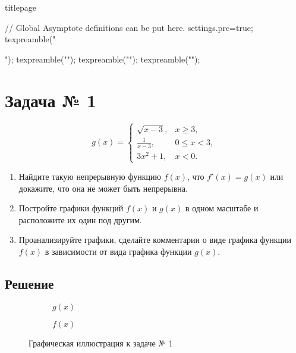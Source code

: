 \documentclass[a4paper,12pt]{article}
\begin{document}
{titlepage}
\clearpage
  \setcounter{page}{2}
  \tableofcontents
\clearpage


\begin{asydef}
// Global Asymptote definitions can be put here.
settings.prc=true;
texpreamble("\usepackage{xltxtra,unicode-math}");
texpreamble("\setmainfont{Times New Roman}");
texpreamble("\setsansfont{Arial}\setmonofont{Courier New}");
texpreamble("");
\end{asydef}

\section{Задача № 1}

\[
  g(x) =
  \begin{cases}
    \sqrt{x - 3}, & x \ge 3, \\
    \frac{1}{x - 3}, & 0 \le x < 3, \\
    3 x^2 + 1, & x < 0.
  \end{cases}
\]

\begin{enumerate}
  \item
    Найдите такую непрерывную функцию \(f(x)\),
    что \(f'(x) = g(x)\) или докажите, что она не может быть непрерывна.
  \item
    Постройте графики функций \(f(x)\) и \(g(x)\) в одном масштабе
    и расположите их один под другим.
  \item
    Проанализируйте графики,
    сделайте комментарии о виде графика функции \(f(x)\)
    в зависимости от вида графика функции \(g(x)\).
\end{enumerate}

\subsection{Решение}

\begin{figure}[htbp]
  \centering
  \begin{subfigure}{\textwidth}
    \centering
    \caption{\(g(x)\)}\label{fig:1-g}
  \end{subfigure}
  \begin{subfigure}{\textwidth}
    \centering
    \caption{\(f(x)\)}\label{fig:1-f}
  \end{subfigure}
  \caption{Графическая иллюстрация к задаче № 1} \label{fig:1}
\end{figure}
\end{document}
